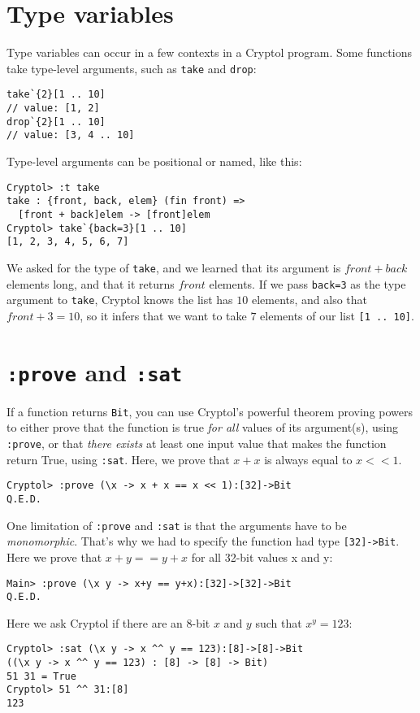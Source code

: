 \documentclass[9pt,letter]{article}
\begin{document}
\section{Type variables}
Type variables can occur in a few contexts in a Cryptol program.
Some functions take type-level arguments, such as \verb+take+ and \verb+drop+:
\begin{verbatim}
take`{2}[1 .. 10]
// value: [1, 2]
drop`{2}[1 .. 10]
// value: [3, 4 .. 10]
\end{verbatim}
Type-level arguments can be positional or named, like this:
\begin{verbatim}
Cryptol> :t take
take : {front, back, elem} (fin front) =>
  [front + back]elem -> [front]elem
Cryptol> take`{back=3}[1 .. 10]
[1, 2, 3, 4, 5, 6, 7]
\end{verbatim}
We asked for the type of \verb+take+, and we learned that its argument
is $front+back$ elements long, and that it returns $front$ elements.
If we pass \verb+back=3+ as the type argument to \verb+take+, Cryptol
knows the list has $10$ elements, and also that $front+3=10$, so it
infers that we want to take $7$ elements of our list \verb+[1 .. 10]+.

\section{{\tt :prove} and {\tt :sat}}
If a function returns \verb+Bit+, you can use Cryptol's powerful
theorem proving powers to either prove that the function is true {\em
for all} values of its argument(s), using \verb+:prove+, or that {\em
there exists} at least one input value that makes the function return
True, using \verb+:sat+. Here, we prove that $x + x$ is always equal
to $x << 1$.
\begin{verbatim}
Cryptol> :prove (\x -> x + x == x << 1):[32]->Bit
Q.E.D.
\end{verbatim}

One limitation of {\tt :prove} and {\tt :sat} is that the arguments
have to be {\em monomorphic}. That's why we had to specify the
function had type \verb+[32]->Bit+. Here we prove that $x+y == y+x$
for all 32-bit values x and y:
\begin{verbatim}
Main> :prove (\x y -> x+y == y+x):[32]->[32]->Bit
Q.E.D.
\end{verbatim}
Here we ask Cryptol if there are an 8-bit $x$ and $y$ such that $x^y = 123$:
\begin{verbatim}
Cryptol> :sat (\x y -> x ^^ y == 123):[8]->[8]->Bit
((\x y -> x ^^ y == 123) : [8] -> [8] -> Bit)
51 31 = True
Cryptol> 51 ^^ 31:[8]
123
\end{verbatim}
\end{document}

